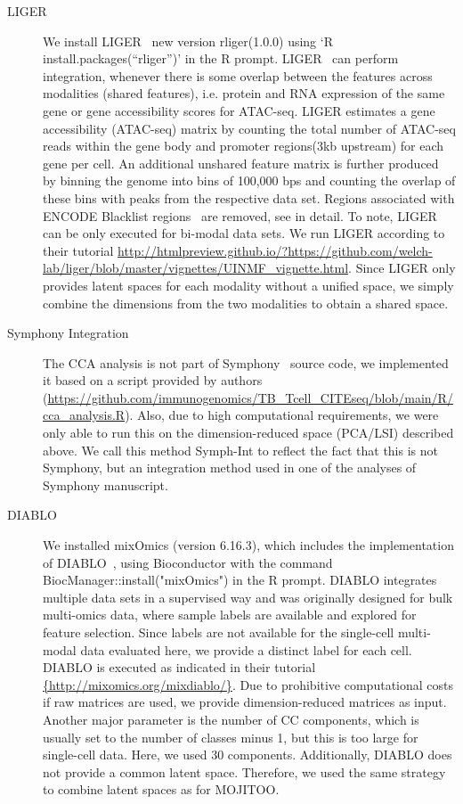 \begin{description}
    \item[LIGER]
    We install LIGER~\cite{kriebel2021nonnegative} new version rliger(1.0.0) using `R install.packages(``rliger'')' in the R prompt. LIGER~\cite{kriebel2021nonnegative} can perform integration, whenever there is some overlap between the features across modalities (shared features), i.e. protein and RNA expression of the same gene or gene accessibility scores for ATAC-seq. LIGER estimates a gene accessibility (ATAC-seq) matrix by counting the total number of ATAC-seq reads within the gene body and promoter regions(3kb upstream) for each gene per cell. An additional unshared feature matrix is further produced by binning the genome into bins of 100,000 bps and counting the overlap of these bins with peaks from the respective data set. Regions associated with ENCODE Blacklist regions~\cite{amemiya2019encode} are removed, see in detail\citep{liu2020jointly}. To note, LIGER can be only executed for bi-modal data sets. We run LIGER according to their tutorial \url{http://htmlpreview.github.io/?https://github.com/welch-lab/liger/blob/master/vignettes/UINMF_vignette.html}. Since LIGER only provides latent spaces for each modality without a unified space, we simply combine the dimensions from the two modalities to obtain a shared space.
    
    \item[Symphony Integration]
    The CCA analysis is not part of Symphony~\cite{kang2021symphony} source code, we implemented it based on a script provided by authors (\url{https://github.com/immunogenomics/TB_Tcell_CITEseq/blob/main/R/cca_analysis.R}). Also, due to high computational requirements, we were only able to run this on the dimension-reduced space (PCA/LSI) described above. We call this method Symph-Int to reflect the fact that this is not Symphony, but an integration method used in one of the analyses of Symphony manuscript. 
    
    \item[DIABLO]
    We installed mixOmics (version 6.16.3), which includes the implementation of DIABLO~\cite{singh2019diablo}, using Bioconductor with the command BiocManager::install("mixOmics") in the R prompt. DIABLO integrates multiple data sets in a supervised way and was originally designed for bulk multi-omics data, where sample labels are available and explored for feature selection. Since labels are not available for the single-cell multi-modal data evaluated here, we provide a distinct label for each cell. DIABLO is executed as indicated in their tutorial \url{{http://mixomics.org/mixdiablo/}}. Due to prohibitive computational costs if raw matrices are used, we provide dimension-reduced matrices as input. Another major parameter is the number of CC components, which is usually set to the number of classes minus 1, but this is too large for single-cell data. Here, we used 30 components. Additionally, DIABLO does not provide a common latent space. Therefore, we used the same strategy to combine latent spaces as for MOJITOO.
\end{description}

